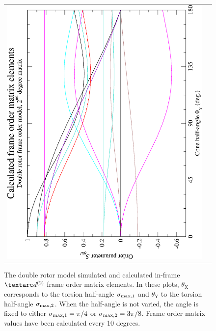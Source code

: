 \begin{figure}
\begin{tabular}{@{}cc@{}}
    \includegraphics[width=.35\textwidth,angle=270]{images/frame_order_matrix/Sijkl_double_rotor_in_frame_theta_y_calc.eps} \\
  \end{tabular}
  \caption[Double rotor simulated and calculated in-frame Daeg$^{(2)}$ elements.]{
    The double rotor model simulated and calculated in-frame $\FOtwo$ frame order matrix elements.
    In these plots, $\theta_\textrm{X}$ corresponds to the torsion half-angle $\sigma_{\textrm{max,1}}$ and $\theta_\textrm{Y}$ to the torsion half-angle $\sigma_{\textrm{max,2}}$.
    When the half-angle is not varied, the angle is fixed to either $\sigma_{\textrm{max,1}} = \pi/4$ or $\sigma_{\textrm{max,2}} = 3\pi/8$.
    Frame order matrix values have been calculated every 10 degrees.
  }
  \label{fig: simulated and calculated in-frame 2nd degree double rotor frame order}
\end{figure}

